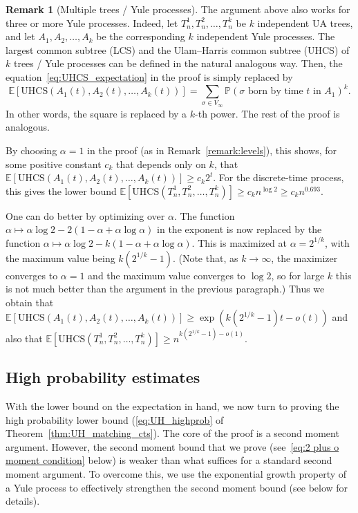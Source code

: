 \documentclass[11pt]{article}
\numberwithin{equation}{section}
\newcommand{\p}{\mathbb{P}} %
\newcommand{\E}{\mathbb{E}} %
\newcommand{\UHCS}{\mathrm{UHCS}} %
\theoremstyle{definition}
\newtheorem{remark}[theorem]{Remark}
\begin{document}
\begin{remark}[Multiple trees / Yule processes]\label{remark:many_trees}
The argument above also works for three or more Yule processes. 
Indeed, let $T_{n}^{1}, T_{n}^{2}, \ldots, T_{n}^{k}$ be $k$ independent UA trees, and  
let $A_{1}, A_{2}, \ldots, A_{k}$ be the corresponding $k$ independent Yule processes. 
The largest common subtree (LCS) and the Ulam--Harris common subtree (UHCS) of $k$ trees / Yule processes can be defined in the natural analogous way. 
Then, the equation~\eqref{eq:UHCS_expectation} in the proof is simply replaced by 
\[
\E \left[ \UHCS(A_{1}(t), A_{2}(t), \ldots, A_{k}(t)) \right] 
= 
\sum_{\sigma \in V_{\infty}} \p \left( \sigma \text{ born by time } t \text{ in } A_{1} \right)^{k}.
\]
In other words, the square is replaced by a $k$-th power. 
The rest of the proof is analogous. 

By choosing $\alpha = 1$ in the proof (as in Remark~\ref{remark:levels}), 
this shows, for some positive constant $c_{k}$ that depends only on $k$, that 
$\E \left[ \UHCS(A_{1}(t), A_{2}(t), \ldots, A_{k}(t)) \right] 
\geq c_{k} 2^{t}$. 
For the discrete-time process, this gives the lower bound 
$\E \left[ \UHCS \left( T_{n}^{1}, T_{n}^{2}, \ldots, T_{n}^{k} \right) \right] 
\geq c_{k} n^{\log 2} 
\geq c_{k} n^{0.693}$. 

One can do better by optimizing over $\alpha$. The function 
$\alpha \mapsto \alpha \log 2 - 2(1-\alpha + \alpha \log \alpha)$
in the exponent is now replaced by the function 
$\alpha \mapsto \alpha \log 2 - k(1-\alpha + \alpha \log \alpha)$. 
This is maximized at $\alpha = 2^{1/k}$, with the maximum value being $k(2^{1/k}-1)$. 
(Note that, as $k \to \infty$, the maximizer converges to $\alpha = 1$ 
and the maximum value converges to $\log 2$, so for large $k$ this is not much better than the argument in the previous paragraph.) 
Thus we obtain that 
$\E \left[ \UHCS(A_{1}(t), A_{2}(t), \ldots, A_{k}(t)) \right] 
\geq \exp \left( k(2^{1/k}-1) t - o(t) \right)$ 
and also that 
$\E \left[ \UHCS \left( T_{n}^{1}, T_{n}^{2}, \ldots, T_{n}^{k} \right) \right] 
\geq n^{k(2^{1/k}-1) - o(1)}$. 
\end{remark}


    
\subsection{High probability estimates}\label{sec:UHLB_whp}


With the lower bound on the expectation in hand, 
we now turn to proving the high probability lower bound (\eqref{eq:UH_highprob} of Theorem~\ref{thm:UH_matching_cts}). 
The core of the proof is a second moment argument. 
However, the second moment bound that we prove (see~\eqref{eq:2 plus o moment condition} below) is weaker than what suffices for a standard second moment argument. 
To overcome this, we use the exponential growth property of a Yule process to effectively strengthen the second moment bound (see below for details). 
\end{document}
